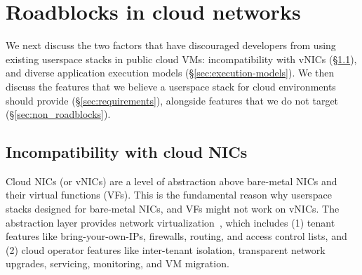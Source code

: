 \section{Roadblocks in cloud networks}

\label{sec:background}
We next discuss the two factors that have discouraged developers from using existing userspace stacks in public cloud VMs: incompatibility with vNICs (\S\ref{sec:limitations-of-vnics}), and diverse application execution models (\S\ref{sec:execution-models}).
We then discuss the features that we believe a userspace stack for cloud environments should provide (\S\ref{sec:requirements}), alongside features that we do not target (\S\ref{sec:non_roadblocks}).

\subsection{Incompatibility with cloud NICs}
\label{sec:limitations-of-vnics}
Cloud NICs (or vNICs) are a level of abstraction above bare-metal NICs and their virtual functions (VFs).
This is the fundamental reason why userspace stacks designed for bare-metal NICs, and VFs might not work on vNICs.
The abstraction layer provides network virtualization~\cite{Koponen:nsdi14,azure_smartnic,andromeda}, which includes (1) tenant features like bring-your-own-IPs, firewalls, routing, and access control lists, and (2) cloud operator features like inter-tenant isolation, transparent network upgrades, servicing, monitoring, and VM migration.

